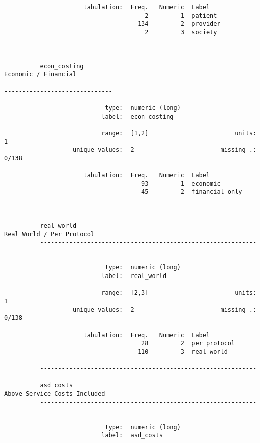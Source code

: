 \documentclass{article}
\begin{document}
\begin{verbatim}
                      tabulation:  Freq.   Numeric  Label
                                       2         1  patient
                                     134         2  provider
                                       2         3  society
          
          ------------------------------------------------------------------------------------------
          econ_costing                                                          Economic / Financial
          ------------------------------------------------------------------------------------------
          
                            type:  numeric (long)
                           label:  econ_costing
          
                           range:  [1,2]                        units:  1
                   unique values:  2                        missing .:  0/138
          
                      tabulation:  Freq.   Numeric  Label
                                      93         1  economic
                                      45         2  financial only
          
          ------------------------------------------------------------------------------------------
          real_world                                                       Real World / Per Protocol
          ------------------------------------------------------------------------------------------
          
                            type:  numeric (long)
                           label:  real_world
          
                           range:  [2,3]                        units:  1
                   unique values:  2                        missing .:  0/138
          
                      tabulation:  Freq.   Numeric  Label
                                      28         2  per protocol
                                     110         3  real world
          
          ------------------------------------------------------------------------------------------
          asd_costs                                                     Above Service Costs Included
          ------------------------------------------------------------------------------------------
          
                            type:  numeric (long)
                           label:  asd_costs
          

\end{verbatim}
\end{document}
